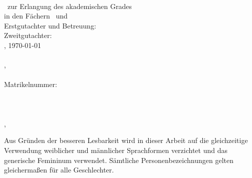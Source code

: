 \hfill
\vfill
{
	\small
	\textbf{\thesisTitle} \\
	\thesisSubject\ zur Erlangung des akademischen Grades \textit{\thesisDegree} \\
	in den Fächern \thesisAuthorFirstSubject\ und \thesisAuthorSecondSubject \\
	Erstgutachter und Betreuung: \thesisFirstReviewer \\
	Zweitgutachter: \thesisSecondReviewer \\
	\thesisAuthorCity, \today \\[1.5em]	
	\textbf{\thesisName} \\
	\thesisAuthorStreet, \thesisAuthorPostalCode\ \thesisAuthorCity \\
	\texttt{\thesisAuthorMail} \\
	Matrikelnummer: \thesisAuthorId \\[1.5em]
	\textbf{\thesisUniversity} \\
	\thesisUniversityDepartment \\
	\thesisUniversityInstitute \\
	\thesisUniversityStreetAddress, \thesisUniversityPostalCode\ \thesisUniversityCity
	
	\vspace*{0.5cm}
	
	\scriptsize
	Aus Gründen der besseren Lesbarkeit wird in dieser Arbeit auf die gleichzeitige Verwendung weiblicher und männlicher Sprachformen verzichtet und das generische Femininum verwendet.
	Sämtliche Personenbezeichnungen gelten gleichermaßen für alle Geschlechter.
}
